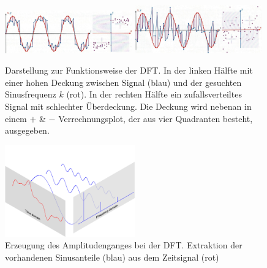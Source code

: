 \begin{figure}
	\centering
	\includegraphics[width=0.49\textwidth]{papers/wavelets/images/2_DFT1.png}
	\includegraphics[width=0.49\textwidth]{papers/wavelets/images/2_DFT2.png}
	\caption{Darstellung zur Funktionsweise der DFT. In der linken Hälfte mit einer hohen Deckung zwischen Signal (blau) und der gesuchten Sinusfrequenz $k$ (rot). In der rechten Hälfte ein zufallsverteiltes Signal mit schlechter Überdeckung. Die Deckung wird nebenan in einem $+$ \& $-$ Verrechnungsplot, der aus vier Quadranten besteht, ausgegeben.}
	\label{wavelet:fig:2_DFT1&2}
\end{figure}

\begin{figure}
	\centering
	\includegraphics[width=0.5\textwidth]{papers/wavelets/images/3_AmplitudengangExtraktionDFT.png}
	\caption{Erzeugung des Amplitudenganges bei der DFT. Extraktion der vorhandenen Sinusanteile (blau) aus dem Zeitsignal (rot) }
	\label{wavelet:fig:AmplitudengangExtraktionDFT}
\end{figure}

